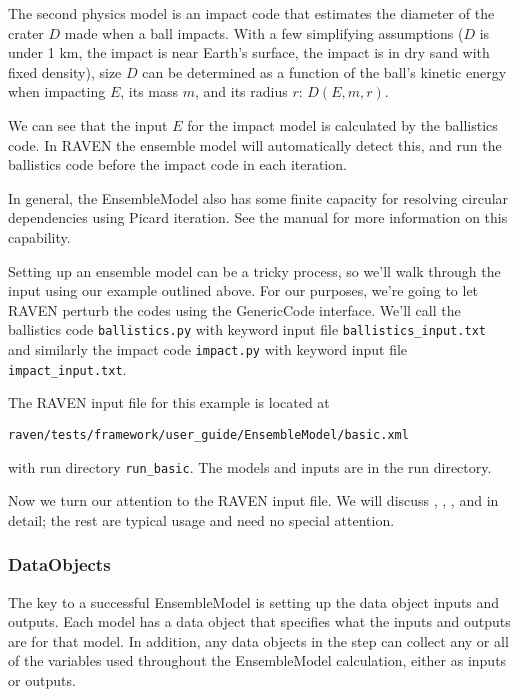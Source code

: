 The second physics model is an impact code that estimates the diameter of the crater $D$ made when a ball
impacts.  With a few simplifying assumptions ($D$ is under 1 km, the impact is near Earth's surface, the
impact is in dry sand with fixed density), size $D$ can be determined as a function of the ball's kinetic
energy when impacting $E$, its mass $m$, and its radius $r$: $D(E,m,r)$.

We can see that the input $E$ for the impact model is calculated by the ballistics code.  In RAVEN the
ensemble model will automatically detect this, and run the ballistics code before the impact code in each
iteration.

In general, the EnsembleModel also has some finite capacity for resolving circular dependencies using Picard
iteration.  See the manual for more information on this capability.

Setting up an ensemble model can be a tricky process, so we'll walk through the input using our example
outlined above.  For
our purposes, we're going to let RAVEN perturb the codes using the GenericCode interface.  We'll call the
ballistics code \texttt{ballistics.py} with keyword input file \texttt{ballistics\_input.txt} and similarly the impact
code \texttt{impact.py} with keyword input file \texttt{impact\_input.txt}.

The RAVEN input file for this example is located at
\begin{verbatim}
raven/tests/framework/user_guide/EnsembleModel/basic.xml
\end{verbatim}
with run directory \texttt{run\_basic}.  The models and inputs are in the run directory.

Now we turn our attention to the RAVEN input file. We will discuss , ,
, and  in detail; the rest are typical usage and need no special attention.

\subsubsection{DataObjects}
The key to a successful EnsembleModel is setting up the data object inputs and outputs.  Each model has a
 data object that specifies what the inputs and outputs are for that model.  In
addition, any  data objects in the  step can collect any or all of the
variables used throughout the EnsembleModel calculation, either as inputs or outputs.

